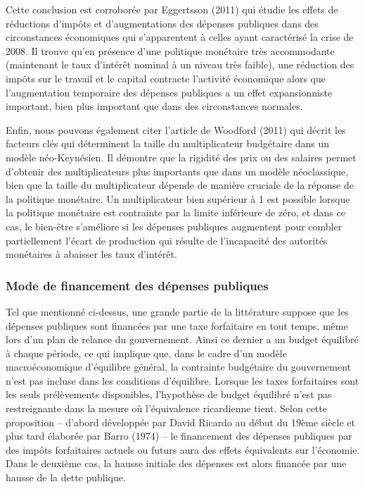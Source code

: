 \documentclass[12pt,letterpaper]{article}
\begin{document}
Cette conclusion est corroborée par Eggertsson (2011) qui étudie les effets de réductions d'impôts et d’augmentations des dépenses publiques dans des circonstances économiques qui s’apparentent à celles ayant caractérisé la crise de 2008. Il trouve qu’en présence d’une politique monétaire très accommodante (maintenant le taux d’intérêt nominal à un niveau très faible), une réduction des impôts sur le travail et le capital contracte l’activité économique alors que l'augmentation temporaire des dépenses publiques a un effet expansionniste important, bien plus important que dans des circonstances normales.

Enfin, nous pouvons également citer l’article de Woodford (2011) qui décrit les facteurs clés qui déterminent la taille du multiplicateur budgétaire dans un modèle néo-Keynésien. Il démontre que la rigidité des prix ou des salaires permet d’obtenir des multiplicateurs plus importants que dans un modèle néoclassique, bien que la taille du multiplicateur dépende de manière cruciale de la réponse de la politique monétaire. Un multiplicateur bien supérieur à 1 est possible lorsque la politique monétaire est contrainte par la limite inférieure de zéro, et dans ce cas, le bien-être s’améliore si les dépenses publiques augmentent pour combler partiellement l'écart de production qui résulte de l'incapacité des autorités monétaires à abaisser les taux d'intérêt.

\subsubsection{Mode de financement des dépenses publiques}

Tel que mentionné ci-dessus, une grande partie de la littérature suppose que les dépenses publiques sont financées par une taxe forfaitaire en tout temps, même lors d’un plan de relance du gouvernement. Ainsi ce dernier a un budget équilibré à chaque période, ce qui implique que, dans le cadre d’un modèle macroéconomique d’équilibre général, la contrainte budgétaire du gouvernement n’est pas incluse dans les conditions d’équilibre. Lorsque les taxes forfaitaires sont les seuls prélèvements disponibles, l’hypothèse de budget équilibré n’est pas restreignante dans la mesure où l’équivalence ricardienne tient. Selon cette proposition – d’abord développée par David Ricardo au début du 19ème siècle et plus tard élaborée par Barro (1974) – le financement des dépenses publiques par des impôts forfaitaires actuels ou futurs aura des effets équivalents sur l'économie. Dans le deuxième cas, la hausse initiale des dépenses est alors financée par une hausse de la dette publique.
\end{document}
